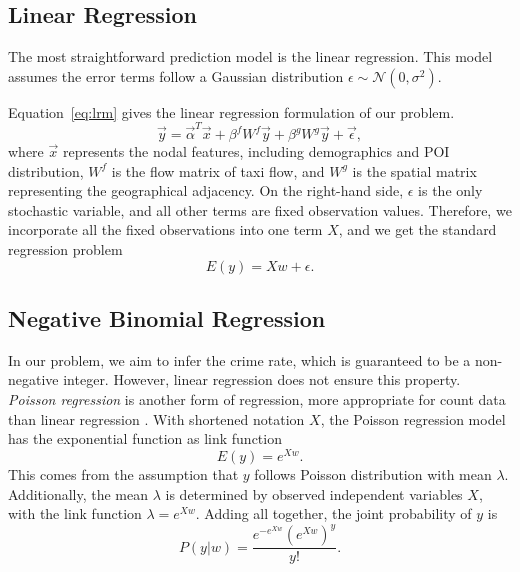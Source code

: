 \subsection{Linear Regression}



The most straightforward prediction model is the linear regression. This model assumes the error terms follow a Gaussian distribution $\epsilon \sim \mathcal{N}(0, \sigma^2)$.


Equation~\ref{eq:lrm} gives the linear regression formulation of our problem.
\begin{equation}
\label{eq:lrm}
\vec{y} = \vec{\alpha}^T \vec{x} + \beta^f W^f \vec{y} + \beta^g W^g \vec{y} + \vec{\epsilon},
\end{equation}
where $\vec{x}$ represents the nodal features, including demographics and POI distribution, $W^f$ is the flow matrix of taxi flow, and $W^g$ is the spatial matrix representing the geographical adjacency. On the right-hand side, $\epsilon$ is the only stochastic variable, and all other terms are fixed observation values. Therefore, we incorporate all the fixed observations into one term $X$, and we get the standard regression problem
\[
E(y) = X w + \epsilon.
\]





\subsection{Negative Binomial Regression}


In our problem, we aim to infer the crime rate, which is guaranteed to be a non-negative integer. However, linear regression does not ensure this property. 
\emph{Poisson regression} is another form of regression, more appropriate for count data than linear regression \cite{GMS95}\cite{Lamb92}. With shortened notation $X$, the Poisson regression model has the exponential function as link function
\begin{equation}
\label{eq:prm}
E(y) = e^{X w}.
\end{equation}
This comes from the assumption that $y$ follows Poisson distribution with mean $\lambda $. Additionally, the mean $\lambda$ is determined by observed independent variables $X$, with the link function $\lambda = e^{Xw}$. Adding all together, the joint probability of $y$ is 
\begin{equation}
P(y|w) = \frac{e^{-e^{Xw}}(e^{Xw})^y}{y!}.
\end{equation}





